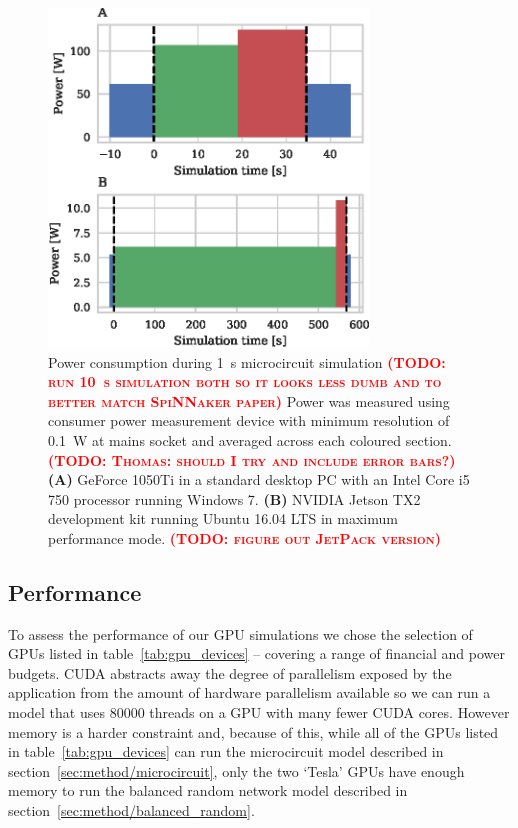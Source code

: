\documentclass[utf8]{frontiersSCNS} %
\newcommand{\todo}[1]{\textbf{\textsc{\textcolor{red}{(TODO: #1)}}}}
\begin{document}
\begin{figure}
    \begin{center}
        \includegraphics[width=85mm]{figures/microcircuit_power}
    \end{center}
    \caption{Power consumption during \SI{1}{\second} microcircuit simulation \todo{run \SI{10}{\second} simulation both so it looks less dumb and to better match SpiNNaker paper}
    Power was measured using consumer power measurement device with minimum resolution of \SI{0.1}{\watt} at mains socket and averaged across each coloured section.\todo{Thomas: should I try and include error bars?}
    \textbf{(A)} GeForce 1050Ti in a standard desktop PC with an Intel Core i5 750 processor running Windows 7.
    \textbf{(B)} NVIDIA Jetson TX2 development kit running Ubuntu 16.04 LTS in maximum performance mode. \todo{figure out JetPack version}}
    \label{fig:microcircuit_power}
\end{figure}

\subsection{Performance}
\label{sec:results/performance}
To assess the performance of our GPU simulations we chose the selection of GPUs listed in table~\ref{tab:gpu_devices} -- covering a range of financial and power budgets.
CUDA abstracts away the degree of parallelism exposed by the application from the amount of hardware parallelism available so we can run a model that uses \num{80000} threads on a GPU with many fewer CUDA cores.
However memory is a harder constraint and, because of this, while all of the GPUs listed in table~\ref{tab:gpu_devices} can run the microcircuit model described in section~\ref{sec:method/microcircuit}, only the two `Tesla' GPUs have enough memory to run the balanced random network model described in section~\ref{sec:method/balanced_random}.
\end{document}
